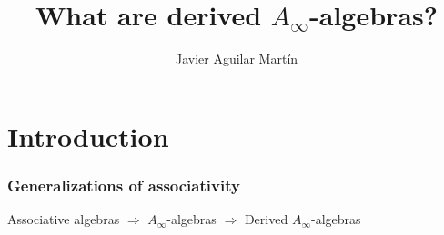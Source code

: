 \documentclass{beamer}
\title{What are derived $A_\infty$-algebras?}
\author{Javier Aguilar Mart\'in}
\institute{University of Kent}
\date{}
\theoremstyle{definition}
\begin{document}
\frame{\titlepage}
%
% 
% 
% 

% 



\newcommand{\seti}{\setcounter{saveenumi}{\value{enumi}}}
\newcommand{\conti}{\setcounter{enumi}{\value{saveenumi}}}

\makeatletter
\makeatother


%
%
%
%
%
%
%
\section{Introduction}
\begin{frame}
\frametitle{Generalizations of associativity}

Associative algebras $\Rightarrow$ $A_\infty$-algebras $\Rightarrow$ Derived $A_\infty$-algebras

\end{frame}
\end{document}
